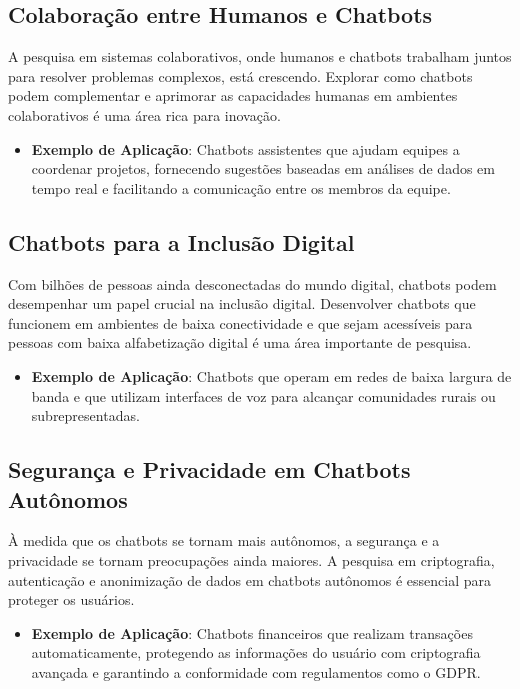 \documentclass[14pt,a4paper,oneside]{book}
\begin{document}
\subsection{Colaboração entre Humanos e Chatbots}

A pesquisa em sistemas colaborativos, onde humanos e chatbots trabalham juntos para resolver problemas complexos, está crescendo. Explorar como chatbots podem complementar e aprimorar as capacidades humanas em ambientes colaborativos é uma área rica para inovação.

\begin{itemize}
	\item \textbf{Exemplo de Aplicação}: Chatbots assistentes que ajudam equipes a coordenar projetos, fornecendo sugestões baseadas em análises de dados em tempo real e facilitando a comunicação entre os membros da equipe.
\end{itemize}

\subsection{Chatbots para a Inclusão Digital}

Com bilhões de pessoas ainda desconectadas do mundo digital, chatbots podem desempenhar um papel crucial na inclusão digital. Desenvolver chatbots que funcionem em ambientes de baixa conectividade e que sejam acessíveis para pessoas com baixa alfabetização digital é uma área importante de pesquisa.

\begin{itemize}
	\item \textbf{Exemplo de Aplicação}: Chatbots que operam em redes de baixa largura de banda e que utilizam interfaces de voz para alcançar comunidades rurais ou subrepresentadas.
\end{itemize}

\subsection{Segurança e Privacidade em Chatbots Autônomos}

À medida que os chatbots se tornam mais autônomos, a segurança e a privacidade se tornam preocupações ainda maiores. A pesquisa em criptografia, autenticação e anonimização de dados em chatbots autônomos é essencial para proteger os usuários.

\begin{itemize}
	\item \textbf{Exemplo de Aplicação}: Chatbots financeiros que realizam transações automaticamente, protegendo as informações do usuário com criptografia avançada e garantindo a conformidade com regulamentos como o GDPR.
\end{itemize}
\end{document}
